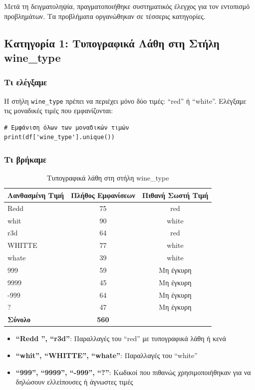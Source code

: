 \documentclass[12pt,a4paper]{article}
\begin{document}
Μετά τη δειγματοληψία, πραγματοποιήθηκε συστηματικός έλεγχος για τον εντοπισμό προβλημάτων. Τα προβλήματα οργανώθηκαν σε τέσσερις κατηγορίες.

\subsection{Κατηγορία 1: Τυπογραφικά Λάθη στη Στήλη wine\_type}

\subsubsection{Τι ελέγξαμε}

Η στήλη \texttt{wine\_type} πρέπει να περιέχει μόνο δύο τιμές: ``red'' ή ``white''. Ελέγξαμε τις μοναδικές τιμές που εμφανίζονται:

\begin{lstlisting}[caption={Έλεγχος μοναδικών τιμών}]
# Εμφάνιση όλων των μοναδικών τιμών
print(df['wine_type'].unique())
\end{lstlisting}

\subsubsection{Τι βρήκαμε}

\begin{table}[H]
\centering
\caption{Τυπογραφικά λάθη στη στήλη wine\_type}
\label{tab:typos}
\begin{tabular}{@{}lcc@{}}
\toprule
\textbf{Λανθασμένη Τιμή} & \textbf{Πλήθος Εμφανίσεων} & \textbf{Πιθανή Σωστή Τιμή} \\
\midrule
Redd  & 75 & red \\
whit & 90 & white \\
r3d & 64 & red \\
WHITTE & 77 & white \\
whate & 39 & white \\
999 & 59 & Μη έγκυρη \\
9999 & 45 & Μη έγκυρη \\
-999 & 64 & Μη έγκυρη \\
? & 47 & Μη έγκυρη \\
\midrule
\textbf{Σύνολο} & \textbf{560} & \\
\bottomrule
\end{tabular}
\end{table}

\begin{infobox}
\begin{itemize}
    \item \textbf{``Redd '', ``r3d''}: Παραλλαγές του ``red'' με τυπογραφικά λάθη ή κενά
    \item \textbf{``whit'', ``WHITTE'', ``whate''}: Παραλλαγές του ``white''
    \item \textbf{``999'', ``9999'', ``-999'', ``?''}: Κωδικοί που πιθανώς χρησιμοποιήθηκαν για να δηλώσουν ελλείπουσες ή άγνωστες τιμές
\end{itemize}
\end{infobox}
\end{document}
